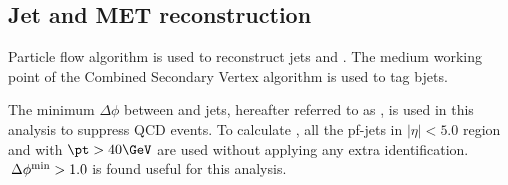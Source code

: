 \subsection{Jet and MET reconstruction}
\label{sec:jetmet}
Particle flow algorithm is used to reconstruct jets and \ETmiss. The medium working point of the Combined Secondary Vertex algorithm is used to tag bjets.

The minimum $\Delta\phi$ between \ETmiss and jets, hereafter referred to as \mindphifour, is used in this analysis to suppress QCD events. To calculate \mindphifour, all the pf-jets in $|\eta|<5.0$ region and with $\pt>40\GeV$ are used without applying any extra identification. $\,{\Delta\phi^{\rm min}} > 1.0$ is found useful for this analysis.

